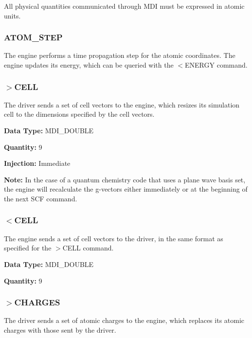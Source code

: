 All physical quantities communicated through M\-D\-I must be expressed in atomic units.\hypertarget{index_atomic_step}{}\subsubsection{A\-T\-O\-M\-\_\-\-S\-T\-E\-P}\label{index_atomic_step}
The engine performs a time propagation step for the atomic coordinates. The engine updates its energy, which can be queried with the {\ttfamily $<$E\-N\-E\-R\-G\-Y} command.\hypertarget{index_set_cell}{}\subsubsection{$>$\-C\-E\-L\-L}\label{index_set_cell}
The driver sends a set of cell vectors to the engine, which resizes its simulation cell to the dimensions specified by the cell vectors.

\begin{DoxyParagraph}{}
{\bfseries  Data Type\-: } M\-D\-I\-\_\-\-D\-O\-U\-B\-L\-E \par
 {\bfseries  Quantity\-: } 9 \par
 {\bfseries  Injection\-: } Immediate \par
 {\bfseries  Note\-: } In the case of a quantum chemistry code that uses a plane wave basis set, the engine will recalculate the g-\/vectors either immediately or at the beginning of the next S\-C\-F command.
\end{DoxyParagraph}
\hypertarget{index_recv_cell}{}\subsubsection{$<$\-C\-E\-L\-L}\label{index_recv_cell}
The engine sends a set of cell vectors to the driver, in the same format as specified for the {\ttfamily $>$C\-E\-L\-L} command.

\begin{DoxyParagraph}{}
{\bfseries  Data Type\-: } M\-D\-I\-\_\-\-D\-O\-U\-B\-L\-E \par
 {\bfseries  Quantity\-: } 9
\end{DoxyParagraph}
\hypertarget{index_send_charges}{}\subsubsection{$>$\-C\-H\-A\-R\-G\-E\-S}\label{index_send_charges}
The driver sends a set of atomic charges to the engine, which replaces its atomic charges with those sent by the driver.


